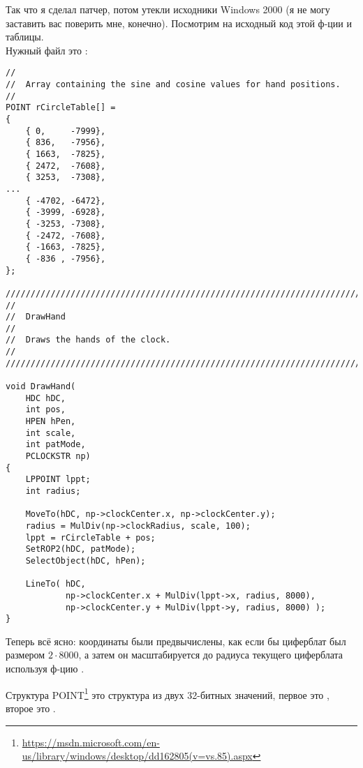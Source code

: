 Так что я сделал патчер, потом утекли исходники Windows 2000 (я не могу заставить вас поверить мне, конечно).
Посмотрим на исходный код этой ф-ции и таблицы.\\
Нужный файл это :

\begin{lstlisting}[style=customc]
//
//  Array containing the sine and cosine values for hand positions.
//
POINT rCircleTable[] =
{
    { 0,     -7999},
    { 836,   -7956},
    { 1663,  -7825},
    { 2472,  -7608},
    { 3253,  -7308},
...
    { -4702, -6472},
    { -3999, -6928},
    { -3253, -7308},
    { -2472, -7608},
    { -1663, -7825},
    { -836 , -7956},
};

////////////////////////////////////////////////////////////////////////////
//
//  DrawHand
//
//  Draws the hands of the clock.
//
////////////////////////////////////////////////////////////////////////////

void DrawHand(
    HDC hDC,
    int pos,
    HPEN hPen,
    int scale,
    int patMode,
    PCLOCKSTR np)
{
    LPPOINT lppt;
    int radius;

    MoveTo(hDC, np->clockCenter.x, np->clockCenter.y);
    radius = MulDiv(np->clockRadius, scale, 100);
    lppt = rCircleTable + pos;
    SetROP2(hDC, patMode);
    SelectObject(hDC, hPen);

    LineTo( hDC,
            np->clockCenter.x + MulDiv(lppt->x, radius, 8000),
            np->clockCenter.y + MulDiv(lppt->y, radius, 8000) );
}
\end{lstlisting}

Теперь всё ясно: координаты были предвычислены, как если бы циферблат был размером $2 \cdot 8000$,
а затем он масштабируется до радиуса текущего циферблата используя ф-цию .

Структура POINT\footnote{\url{https://msdn.microsoft.com/en-us/library/windows/desktop/dd162805(v=vs.85).aspx}}
это структура из двух 32-битных значений, первое это , второе это .

